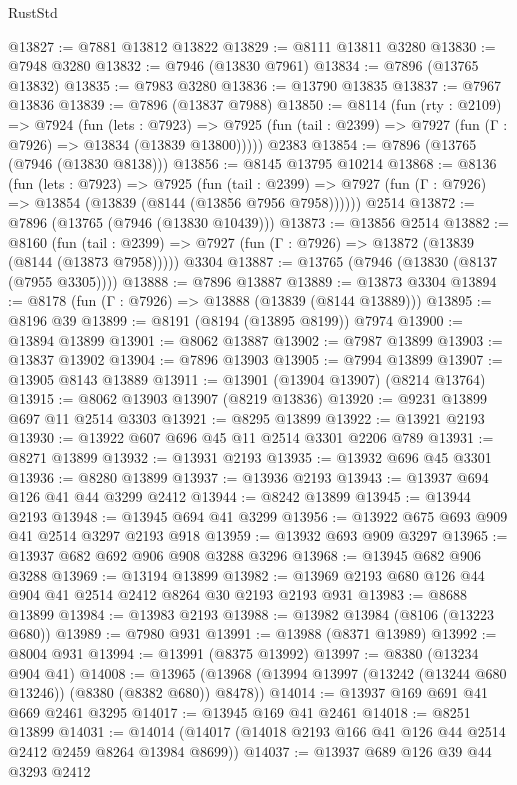 \begin{lexlean}{RustStd}
\begin{coremodule}
{\begin{coremodule}
{{{{{{{{{{{{{{{{{{{{{{{{{{{{{{{{{{{{{{{{{{{{{{{{{{@13827 := @7881 @13812 @13822
@13829 := @8111 @13811 @3280
@13830 := @7948 @3280
@13832 := @7946 (@13830 @7961)
@13834 := @7896 (@13765 @13832)
@13835 := @7983 @3280
@13836 := @13790 @13835
@13837 := @7967 @13836
@13839 := @7896 (@13837 @7988)
@13850 := @8114
    (fun (rty : @2109) =>
    @7924
      (fun (lets : @7923) =>
      @7925 (fun (tail : @2399) => @7927 (fun (Γ : @7926) => @13834 (@13839 @13800)))))
    @2383
@13854 := @7896 (@13765 (@7946 (@13830 @8138)))
@13856 := @8145 @13795 @10214
@13868 := @8136
    (fun (lets : @7923) =>
    @7925
      (fun (tail : @2399) =>
      @7927 (fun (Γ : @7926) => @13854 (@13839 (@8144 (@13856 @7956 @7958))))))
    @2514
@13872 := @7896 (@13765 (@7946 (@13830 @10439)))
@13873 := @13856 @2514
@13882 := @8160
    (fun (tail : @2399) => @7927 (fun (Γ : @7926) => @13872 (@13839 (@8144 (@13873 @7958)))))
    @3304
@13887 := @13765 (@7946 (@13830 (@8137 (@7955 @3305))))
@13888 := @7896 @13887
@13889 := @13873 @3304
@13894 := @8178 (fun (Γ : @7926) => @13888 (@13839 (@8144 @13889)))
@13895 := @8196 @39
@13899 := @8191 (@8194 (@13895 @8199)) @7974
@13900 := @13894 @13899
@13901 := @8062 @13887
@13902 := @7987 @13899
@13903 := @13837 @13902
@13904 := @7896 @13903
@13905 := @7994 @13899
@13907 := @13905 @8143 @13889
@13911 := @13901 (@13904 @13907) (@8214 @13764)
@13915 := @8062 @13903 @13907 (@8219 @13836)
@13920 := @9231 @13899 @697 @11 @2514 @3303
@13921 := @8295 @13899
@13922 := @13921 @2193
@13930 := @13922 @607 @696 @45 @11 @2514 @3301 @2206 @789
@13931 := @8271 @13899
@13932 := @13931 @2193
@13935 := @13932 @696 @45 @3301
@13936 := @8280 @13899
@13937 := @13936 @2193
@13943 := @13937 @694 @126 @41 @44 @3299 @2412
@13944 := @8242 @13899
@13945 := @13944 @2193
@13948 := @13945 @694 @41 @3299
@13956 := @13922 @675 @693 @909 @41 @2514 @3297 @2193 @918
@13959 := @13932 @693 @909 @3297
@13965 := @13937 @682 @692 @906 @908 @3288 @3296
@13968 := @13945 @682 @906 @3288
@13969 := @13194 @13899
@13982 := @13969 @2193 @680 @126 @44 @904 @41 @2514 @2412 @8264 @30 @2193 @2193 @931
@13983 := @8688 @13899
@13984 := @13983 @2193
@13988 := @13982 @13984 (@8106 (@13223 @680))
@13989 := @7980 @931
@13991 := @13988 (@8371 @13989)
@13992 := @8004 @931
@13994 := @13991 (@8375 @13992)
@13997 := @8380 (@13234 @904 @41)
@14008 := @13965 (@13968 (@13994 @13997 (@13242 (@13244 @680 @13246)) (@8380 (@8382 @680)) @8478))
@14014 := @13937 @169 @691 @41 @669 @2461 @3295
@14017 := @13945 @169 @41 @2461
@14018 := @8251 @13899
@14031 := @14014 (@14017 (@14018 @2193 @166 @41 @126 @44 @2514 @2412 @2459 @8264 @13984 @8699))
@14037 := @13937 @689 @126 @39 @44 @3293 @2412
}}}}}}}}}}}}}}}}}}}}}}}}}}}}}}}}}}}}}}}}}}}}}}}}}}
\end{coremodule}}
\end{coremodule}
\end{lexlean}
